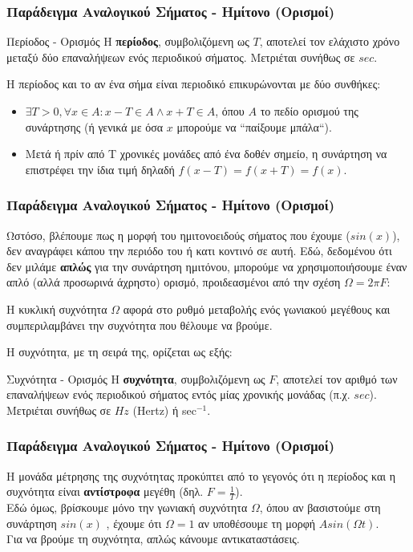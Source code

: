 \documentclass{beamer}
\begin{document}
\begin{frame}
	\frametitle{Παράδειγμα Αναλογικού Σήματος - Ημίτονο (Ορισμοί)}

	
	\begin{block}{Περίοδος - Ορισμός}
	Η \textbf{περίοδος}, συμβολιζόμενη ως $T$, αποτελεί τον ελάχιστο χρόνο μεταξύ δύο επαναλήψεων ενός περιοδικού σήματος. Μετριέται συνήθως σε $sec$.
	\end{block}
	Η περίοδος και το αν ένα σήμα είναι περιοδικό επικυρώνονται με δύο συνθήκες: \pause 
	\begin{itemize} 
		\item $\exists T>0,\forall x \in A: x-T \in A \wedge x+T \in A$, όπου $A$ το πεδίο ορισμού της συνάρτησης (ή γενικά με όσα $x$ μπορούμε να ``παίξουμε μπάλα``). \pause
		\item Μετά ή πρίν από Τ χρονικές μονάδες από ένα δοθέν σημείο, η συνάρτηση να επιστρέφει την ίδια τιμή δηλαδή $f(x-T) = f(x+T) = f(x)$.
	\end{itemize}
\end{frame}

\begin{frame}
	\frametitle{Παράδειγμα Αναλογικού Σήματος - Ημίτονο (Ορισμοί)}
	Ωστόσο, βλέπουμε πως η μορφή του ημιτονοειδούς σήματος που έχουμε ($sin(x)$), δεν αναγράφει κάπου την περιόδο του ή κατι κοντινό σε αυτή. Εδώ, δεδομένου ότι δεν μιλάμε \textbf{απλώς} για την συνάρτηση ημιτόνου, μπορούμε να χρησιμοποιήσουμε έναν απλό (αλλά προσωρινά άχρηστο) ορισμό, προιδεασμένοι από την σχέση $\Omega=2\pi F$:
	\begin{center}
		Η κυκλική συχνότητα $\Omega$ αφορά στο ρυθμό μεταβολής ενός γωνιακού μεγέθους και \alert{συμπεριλαμβάνει} την συχνότητα που θέλουμε να βρούμε.
	\end{center}
	Η συχνότητα, με τη σειρά της, ορίζεται ως εξής:
		\begin{block}{Συχνότητα - Ορισμός}
		Η \textbf{συχνότητα}, συμβολιζόμενη ως $F$, αποτελεί τον αριθμό των επαναλήψεων ενός περιοδικού σήματος εντός μίας χρονικής μονάδας (π.χ. $sec$). Μετριέται συνήθως σε \textlatin{$Hz$ (Hertz)} ή \textlatin{sec$^{-1}$}.
	\end{block}
\end{frame}

\begin{frame}
	\frametitle{Παράδειγμα Αναλογικού Σήματος - Ημίτονο (Ορισμοί)}
	Η μονάδα μέτρησης της συχνότητας προκύπτει από το γεγονός ότι η περίοδος και η συχνότητα είναι \textbf{αντίστροφα} μεγέθη (δηλ. $F=\frac{1}{T}$).\\
	Εδώ όμως, βρίσκουμε μόνο την γωνιακή συχνότητα $\Omega$, όπου αν βασιστούμε στη συνάρτηση $sin(x)$ , έχουμε ότι $\Omega = 1$ αν υποθέσουμε τη μορφή $Asin(\Omega t)$.
	\\ 
	Για να βρούμε τη συχνότητα, απλώς κάνουμε αντικαταστάσεις.
\end{frame}
\end{document}

